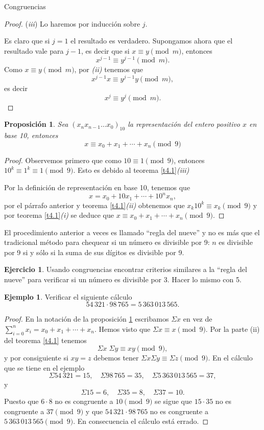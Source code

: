 \documentclass[11pt,spanish,makeidx]{amsbook}
\newtheorem{proposicion}[teorema]{Proposici\'on}
\theoremstyle{definition}
\newtheorem{ejemplo}{Ejemplo}[section]
\newtheorem{ejercicio}{Ejercicio}[section]
\theoremstyle{remark}
\begin{document}
\begin{section}{Congruencias}
\begin{proof}
({\em iii}) Lo haremos por inducción sobre $j$. 

Es claro que si $j=1$ el resultado es verdadero. Supongamos ahora que el resultado vale para $j-1$, es decir que si  $x \equiv y \pmod{m}$, entonces 
$$
x^{j-1} \equiv y^{j-1} \pmod{m}.
$$
Como $x \equiv y \pmod{m}$,  por   {\em (ii)} tenemos que 
$$
x^{j-1}x \equiv y^{j-1}y  \pmod{m},
$$
es decir 
$$
x^j \equiv y^j \pmod{m}.
$$
\end{proof}

\begin{proposicion}\label{prop412} Sea $(x_nx_{n-1}\ldots x_0)_{10}$ la representación del entero positivo $x$ en base 10, entonces
$$
x \equiv x_0+x_1+\cdots+x_n \pmod{9}
$$
\end{proposicion}
\begin{proof}
 Observemos primero que como $10\equiv 1\pmod{9}$, entonces  $10^k\equiv 1^k \equiv 1\pmod{9}$. Esto es debido  al teorema \ref{t4.1}{\em (iii)} 

Por la definición de representación en base 10, tenemos que 
$$
x=x_0 + 10x_1+ \cdots+10^nx_n,
$$ 
por el párrafo anterior y teorema \ref{t4.1}{\em (ii)}  obtenemos que $x_k10^k \equiv x_k \pmod{9}$ y por teorema \ref{t4.1}{\em (i)} se deduce que $x \equiv x_0+x_1+\cdots+x_n \pmod{9}$.
\end{proof}

El procedimiento anterior a veces es llamado ``regla del nueve''   y no es más que el tradicional método para chequear si un número es divisible por 9: $n$ es divisible por 9 si y sólo si la suma de sus dígitos es divisible por 9.  

\begin{ejercicio}
	Usando congruencias encontrar criterios similares  a la ``regla del nueve'' para verificar si un número es divisible por 3. Hacer lo mismo con 5. 
\end{ejercicio}

\begin{ejemplo} Verificar  el siguiente cálculo
$$
54\,321 \cdot 98\,765= 5\,363\,013\,565.
$$
\end{ejemplo}
\begin{proof}
En la notación de la proposición \ref{prop412} escribamos $\Sigma x$ en vez de $ \sum_{i=0}^n x_i = x_0+x_1+\cdots+x_n$. Hemos visto que $\Sigma x \equiv x \pmod{9}$. Por la parte (ii) del teorema \ref{t4.1} tenemos
$$
\Sigma x\;\Sigma y \equiv xy \pmod{9},
$$
y por consiguiente si $xy=z$ debemos tener $\Sigma x\Sigma y \equiv\Sigma z \pmod{9}$. En el cálculo que se tiene en el ejemplo
$$
\Sigma 54\,321=15,\quad \Sigma 98\,765=35,\quad
\Sigma 5\,363\,013\,565=37,
$$
y
$$
\Sigma 15=6, \quad \Sigma 35=8,\quad \Sigma 37=10.
$$
Puesto que $6 \cdot 8$ no es congruente a $10 \pmod{9}$ se sigue que $15 \cdot 35$ no es congruente a $37 \pmod{9}$ y que $54\,321 \cdot 98\,765$ no es congruente a $5\,363\,013\,565\pmod{9}$. En consecuencia el cálculo está errado.
\end{proof}


\end{section}
\end{document}
